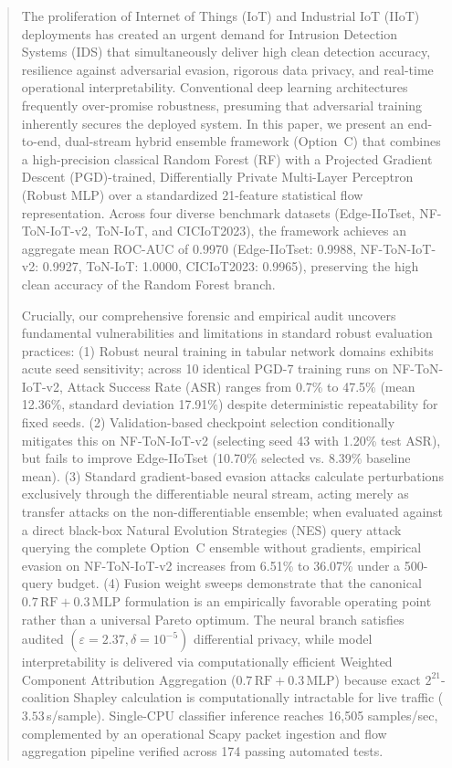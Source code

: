 \documentclass[10pt,journal,compsoc,twocolumn]{IEEEtran}
\begin{document}
\begin{abstract}
The proliferation of Internet of Things (IoT) and Industrial IoT (IIoT) deployments has created an urgent demand for Intrusion Detection Systems (IDS) that simultaneously deliver high clean detection accuracy, resilience against adversarial evasion, rigorous data privacy, and real-time operational interpretability. Conventional deep learning architectures frequently over-promise robustness, presuming that adversarial training inherently secures the deployed system. In this paper, we present an end-to-end, dual-stream hybrid ensemble framework (Option~C) that combines a high-precision classical Random Forest (RF) with a Projected Gradient Descent (PGD)-trained, Differentially Private Multi-Layer Perceptron (Robust MLP) over a standardized 21-feature statistical flow representation. Across four diverse benchmark datasets (Edge-IIoTset, NF-ToN-IoT-v2, ToN-IoT, and CICIoT2023), the framework achieves an aggregate mean ROC-AUC of 0.9970 (Edge-IIoTset: 0.9988, NF-ToN-IoT-v2: 0.9927, ToN-IoT: 1.0000, CICIoT2023: 0.9965), preserving the high clean accuracy of the Random Forest branch. 

Crucially, our comprehensive forensic and empirical audit uncovers fundamental vulnerabilities and limitations in standard robust evaluation practices: (1) Robust neural training in tabular network domains exhibits acute seed sensitivity; across 10 identical PGD-7 training runs on NF-ToN-IoT-v2, Attack Success Rate (ASR) ranges from 0.7\% to 47.5\% (mean 12.36\%, standard deviation 17.91\%) despite deterministic repeatability for fixed seeds. (2) Validation-based checkpoint selection conditionally mitigates this on NF-ToN-IoT-v2 (selecting seed 43 with 1.20\% test ASR), but fails to improve Edge-IIoTset (10.70\% selected vs. 8.39\% baseline mean). (3) Standard gradient-based evasion attacks calculate perturbations exclusively through the differentiable neural stream, acting merely as transfer attacks on the non-differentiable ensemble; when evaluated against a direct black-box Natural Evolution Strategies (NES) query attack querying the complete Option~C ensemble without gradients, empirical evasion on NF-ToN-IoT-v2 increases from 6.51\% to 36.07\% under a 500-query budget. (4) Fusion weight sweeps demonstrate that the canonical $0.7\,\text{RF} + 0.3\,\text{MLP}$ formulation is an empirically favorable operating point rather than a universal Pareto optimum. The neural branch satisfies audited $(\varepsilon=2.37, \delta=10^{-5})$ differential privacy, while model interpretability is delivered via computationally efficient Weighted Component Attribution Aggregation ($0.7\,\text{RF} + 0.3\,\text{MLP}$) because exact $2^{21}$-coalition Shapley calculation is computationally intractable for live traffic ($3.53$\,s/sample). Single-CPU classifier inference reaches 16,505 samples/sec, complemented by an operational Scapy packet ingestion and flow aggregation pipeline verified across 174 passing automated tests.
\end{abstract}
\end{document}
